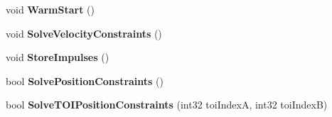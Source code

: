 \begin{DoxyCompactItemize}
void {\bfseries Warm\+Start} ()
\item 
\mbox{\label{classb2ContactSolver_abec74e1246fdbfddbd2236602da63e1f}} 
void {\bfseries Solve\+Velocity\+Constraints} ()
\item 
\mbox{\label{classb2ContactSolver_aff5922a65bb5ccf473c425719bb8938d}} 
void {\bfseries Store\+Impulses} ()
\item 
\mbox{\label{classb2ContactSolver_a4696834a137001bc74faec643b117031}} 
bool {\bfseries Solve\+Position\+Constraints} ()
\item 
\mbox{\label{classb2ContactSolver_a6604c8fc034f89ad2e3461f4b5c20844}} 
bool {\bfseries Solve\+T\+O\+I\+Position\+Constraints} (int32 toi\+IndexA, int32 toi\+IndexB)
\end{DoxyCompactItemize}
